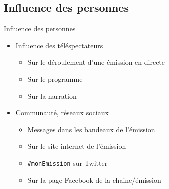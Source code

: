 \documentclass{beamer}
\begin{document}
	\subsection{Influence des personnes}
	\begin{frame}{Influence des personnes}
\begin{itemize}
	\item Influence des téléspectateurs
		\begin{itemize}
			\item Sur le déroulement d'une émission en directe
			\item Sur le programme
			\item Sur la narration
		\end{itemize}
	\pause
		\vfill
	\item Communauté, réseaux sociaux
		\begin{itemize}
			\item Messages dans les bandeaux de l'émission
			\item Sur le site internet de l'émission
			\item \texttt{\#monEmission} sur Twitter
			\item Sur la page Facebook de la chaine/émission
		\end{itemize}
		\vfill
\end{itemize}
	\end{frame}
\end{document}

